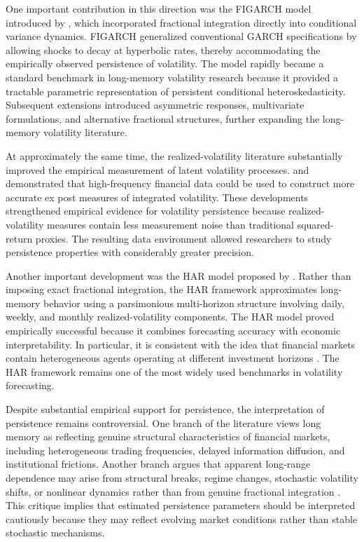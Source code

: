 \documentclass[unnumsec,webpdf,contemporary,large]{oup-authoring-template}%
\theoremstyle{thmstyleone}%
\theoremstyle{thmstyletwo}%
\theoremstyle{thmstylethree}%
\begin{document}
One important contribution in this direction was the FIGARCH model
introduced by \citet{baillie1996fractionally}, which incorporated
fractional integration directly into conditional variance dynamics.
FIGARCH generalized conventional GARCH specifications by allowing shocks to
decay at hyperbolic rates, thereby accommodating the empirically observed
persistence of volatility. The model rapidly became a standard benchmark in
long-memory volatility research because it provided a tractable parametric
representation of persistent conditional heteroskedasticity. Subsequent
extensions introduced asymmetric responses, multivariate formulations, and
alternative fractional structures, further expanding the long-memory
volatility literature.

At approximately the same time, the realized-volatility literature
substantially improved the empirical measurement of latent volatility
processes. \citet{andersen2003modeling} and \citet{barndorff2002econometric}
demonstrated that high-frequency financial data could be used to construct
more accurate ex post measures of integrated volatility. These developments
strengthened empirical evidence for volatility persistence because
realized-volatility measures contain less measurement noise than traditional
squared-return proxies. The resulting data environment allowed researchers
to study persistence properties with considerably greater precision.

Another important development was the HAR model proposed by
\citet{corsi2009simple}. Rather than imposing exact fractional integration,
the HAR framework approximates long-memory behavior using a parsimonious
multi-horizon structure involving daily, weekly, and monthly
realized-volatility components. The HAR model proved empirically successful
because it combines forecasting accuracy with economic interpretability. In
particular, it is consistent with the idea that financial markets contain
heterogeneous agents operating at different investment horizons
\citep{muller1997volatilities}. The HAR framework remains one of the most
widely used benchmarks in volatility forecasting.

Despite substantial empirical support for persistence, the interpretation of
persistence remains controversial. One branch of the literature views long
memory as reflecting genuine structural characteristics of financial markets,
including heterogeneous trading frequencies, delayed information diffusion,
and institutional frictions. Another branch argues that apparent long-range
dependence may arise from structural breaks, regime changes, stochastic
volatility shifts, or nonlinear dynamics rather than from genuine fractional
integration \citep{mikosch2004nonstationarities}. This critique implies that
estimated persistence parameters should be interpreted cautiously because
they may reflect evolving market conditions rather than stable stochastic
mechanisms.
\end{document}
